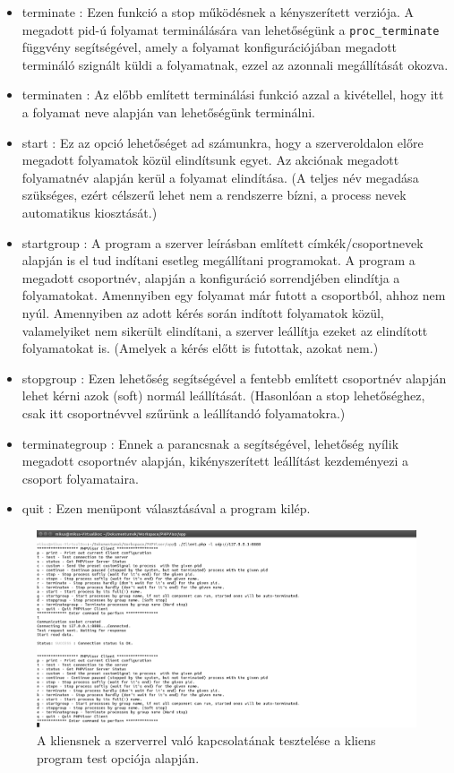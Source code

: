 \documentclass[12pt]{report}
\begin{document}
\begin{itemize}
\item terminate : Ezen funkció a stop működésnek a kényszerített verziója. A megadott pid-ú folyamat terminálására van lehetőségünk a \verb|proc_terminate| függvény segítségével, amely a folyamat konfigurációjában megadott termináló szignált küldi a folyamatnak, ezzel az azonnali megállítását okozva.
\item terminaten : Az előbb említett terminálási funkció azzal a kivétellel, hogy itt a folyamat neve alapján van lehetőségünk terminálni.
\item start : Ez az opció lehetőséget ad számunkra, hogy a szerveroldalon előre megadott folyamatok közül elindítsunk egyet. Az akciónak megadott folyamatnév alapján kerül a folyamat elindítása. (A teljes név megadása szükséges, ezért célszerű lehet nem a rendszerre bízni, a process nevek automatikus kiosztását.)
\item startgroup : A program a szerver leírásban említett címkék/csoportnevek alapján is el tud indítani esetleg megállítani programokat.  A program a megadott csoportnév, alapján a konfiguráció sorrendjében elindítja a folyamatokat. Amennyiben egy folyamat már futott a csoportból, ahhoz nem nyúl. Amennyiben az adott kérés során indított folyamatok közül, valamelyiket nem sikerült elindítani, a szerver leállítja ezeket az elindított folyamatokat is. (Amelyek a kérés előtt is futottak, azokat nem.)
\item stopgroup : Ezen lehetőség segítségével a fentebb említett csoportnév alapján lehet kérni azok (soft) normál leállítását. (Hasonlóan a stop lehetőséghez, csak itt csoportnévvel szűrünk a leállítandó folyamatokra.)
\item terminategroup : Ennek a parancsnak a segítségével, lehetőség nyílik megadott csoportnév alapján, kikényszerített leállítást kezdeményezi a csoport folyamataira.
\item quit : Ezen menüpont választásával a program kilép. 
\end{itemize}
 \begin{figure}[ht]
  \centering
  \includegraphics[width=15cm]{pics/test.png}
	  \caption{A kliensnek a szerverrel való kapcsolatának tesztelése a kliens program test opciója alapján.}
      \label{fig:clitest}
  \end{figure}
  
\end{document}
